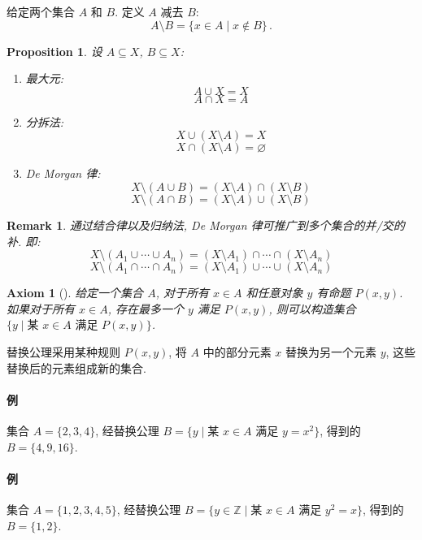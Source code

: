 \documentclass[UTF8]{ctexart}
\theoremstyle{mystyle}
\newtheorem{axiom}{Axiom}[section]
\newtheorem{proposition}{Proposition}[section]
\theoremstyle{myremark}
\newtheorem*{remark}{Remark}
\theoremstyle{plain}
\newcommand{\Z}{\mathbb Z}
\begin{document}
\begin{definition}[\text{差}]
    给定两个集合 $ A $ 和 $ B $. 定义 $ A $ 减去 $ B $:
    \[ A \setminus B = \{x \in A \mid x \not\in B\} \,.\]
\end{definition}

\begin{proposition}
    设 $ A \subseteq X $, $ B \subseteq X $: 
    \begin{enumerate}
        \item 最大元: \[ A \cup X = X \] \[ A \cap X = A \]
        \item 分拆法: \[ X \cup (X \setminus A) = X \] \[ X \cap (X \setminus A) = \varnothing \]
        \item De Morgan 律: \[ X \setminus (A \cup B) = (X \setminus A) \cap (X \setminus B) \] \[ X \setminus (A \cap B) = (X \setminus A) \cup (X \setminus B) \]
    \end{enumerate}
\end{proposition}

\begin{remark}
    通过结合律以及归纳法, De Morgan 律可推广到多个集合的并/交的补. 即: \[ X \setminus (A_1 \cup \cdots \cup A_n) = (X \setminus A_1) \cap \cdots \cap (X \setminus A_n) \] \[ X \setminus (A_1 \cap \cdots \cap A_n) = (X \setminus A_1) \cup \cdots \cup (X \setminus A_n) \]
\end{remark}
    



\begin{axiom}[]
    给定一个集合 $ A $, 对于所有 $ x \in A $ 和任意对象 $ y $ 有命题 $ P(x, y) $. 如果对于所有 $ x \in A $, 存在最多一个 $ y $ 满足 $ P(x, y) $, 则可以构造集合 $ \{ y \mid \text{某 } x \in A \text{ 满足 } P(x, y) \} $.
\end{axiom}

替换公理采用某种规则 $ P(x, y) $, 将 $ A $ 中的部分元素 $ x $ 替换为另一个元素 $ y $, 这些替换后的元素组成新的集合.

\paragraph{例} 
集合 $ A = \{2, 3, 4\} $, 经替换公理 $ B = \{y \mid \text{某 } x \in A \text{ 满足 } y = x^2 \} $, 得到的 $ B = \{4, 9, 16\} $.

\paragraph{例} 
集合 $ A = \{1, 2, 3, 4, 5\} $, 经替换公理 $ B = \{y \in \Z \mid \text{某 } x \in A \text{ 满足 } y^2 = x \} $, 得到的 $ B = \{1, 2\} $.
\end{document}
